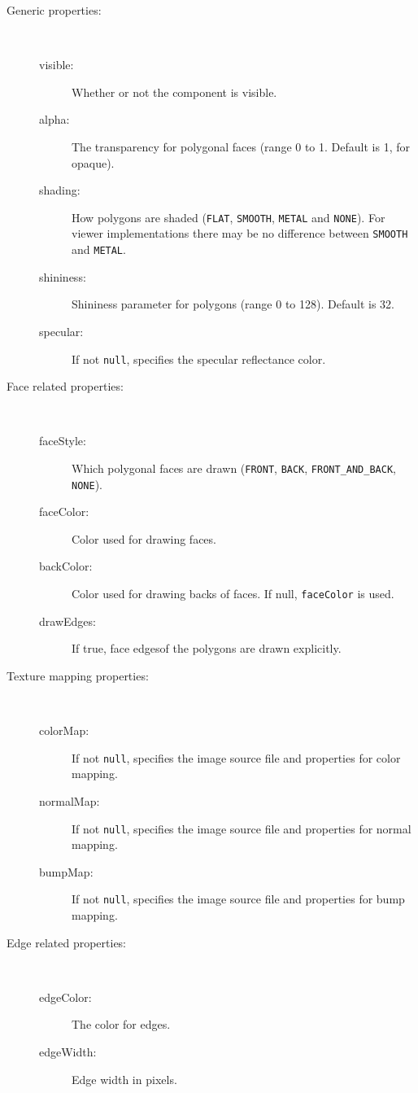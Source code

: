 \documentclass{article}
\begin{document}
\begin{description}

\item[Generic properties:]
\hfil \\
\begin{description}
\item[visible:]
Whether or not the component is visible.
\item[alpha:]
The transparency for polygonal faces (range 0 to 1. Default is 1, for
opaque).
\item[shading:] 
How polygons are shaded ({\tt FLAT}, {\tt SMOOTH},
{\tt METAL} and {\tt NONE}).  For viewer implementations there may be no
difference between {\tt SMOOTH} and {\tt METAL}.
\item[shininess:]
Shininess parameter for polygons (range 0 to 128). Default is 32.
\item[specular:]
If not {\tt null}, specifies the specular reflectance color.
\end{description}

\item[Face related properties:]
\hfil \\
\begin{description}
\item[faceStyle:]
Which polygonal faces are drawn ({\tt FRONT}, {\tt BACK},
{\tt FRONT\_AND\_BACK}, {\tt NONE}).
\item[faceColor:] 
Color used for drawing faces.
\item[backColor:]
Color used for drawing backs of faces. If null, {\tt faceColor} is used.
\item[drawEdges:] 	
If true, face edgesof the polygons are drawn explicitly.
\end{description}

\item[Texture mapping properties:]
\hfil \\
\begin{description}
\item[colorMap:]
If not {\tt null}, specifies the image source file and properties
for color mapping.
\item[normalMap:]
If not {\tt null}, specifies the image source file and properties
for normal mapping.
\item[bumpMap:]
If not {\tt null}, specifies the image source file and properties
for bump mapping.
\end{description}

\item[Edge related properties:]
\hfil \\
\begin{description}
\item[edgeColor:]
The color for edges.
\item[edgeWidth:]
Edge width in pixels.
\end{description}


\end{description}
\end{document}
